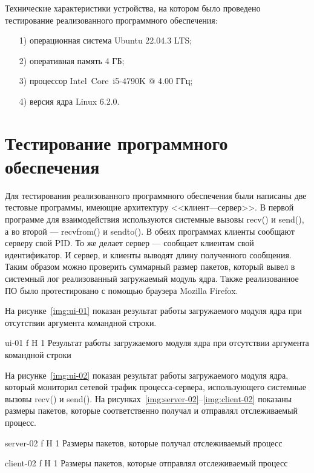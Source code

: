 \documentclass{bmstu}
\begin{document}
Технические характеристики устройства, на котором было проведено тестирование реализованного программного обеспечения:
\begin{enumerate}
\item[1)]
операционная система Ubuntu 22.04.3 LTS;
\item[2)]
оперативная память 4 ГБ;
\item[3)]
процессор Intel\textregistered ~Core\texttrademark ~i5-4790K @ 4.00 ГГц;
\item[4)] версия ядра Linux 6.2.0.
\end{enumerate}

\section{Тестирование программного обеспечения}

Для тестирования реализованного программного обеспечения были написаны две тестовые программы, имеющие архитектуру <<клиент---сервер>>. 
В первой программе для взаимодействия используются системные вызовы recv() и send(), а во второй --- recvfrom() и sendto(). 
В обеих программах клиенты сообщают серверу свой PID. 
То же делает сервер --- сообщает клиентам свой идентификатор. 
И сервер, и клиенты выводят длину полученного сообщения. 
Таким образом можно проверить суммарный размер пакетов, который вывел в системный лог реализованный загружаемый модуль ядра. 
Также реализованное ПО было протестировано с помощью браузера Mozilla Firefox.

На рисунке~\ref{img:ui-01} показан результат работы загружаемого модуля ядра при отсутствии аргумента командной строки.

    {ui-01}
    {f}
    {H}
    {1\textwidth}
    {Результат работы загружаемого модуля ядра при отсутствии аргумента командной строки}
 
На рисунке~\ref{img:ui-02} показан результат работы загружаемого модуля ядра, который мониторил сетевой трафик процесса-сервера, использующего системные вызовы recv() и send(). 
На рисунках~\ref{img:server-02}--\ref{img:client-02} показаны размеры пакетов, которые соответственно получал и отправлял отслеживаемый процесс.

    {server-02}
    {f}
    {H}
    {1\textwidth}
    {Размеры пакетов, которые получал отслеживаемый процесс}
    
    {client-02}
    {f}
    {H}
    {1\textwidth}
    {Размеры пакетов, которые отправлял отслеживаемый процесс}
\end{document}

